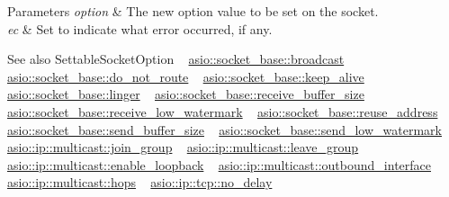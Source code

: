\begin{DoxyParams}{Parameters}
{\em option} & The new option value to be set on the socket.\\
\hline
{\em ec} & Set to indicate what error occurred, if any.\\
\hline
\end{DoxyParams}
\begin{DoxySeeAlso}{See also}
Settable\+Socket\+Option ~\newline
\hyperlink{classasio_1_1socket__base_adb7828bb32a8912680906a66a6551ec3}{asio\+::socket\+\_\+base\+::broadcast} ~\newline
\hyperlink{classasio_1_1socket__base_ab7b1853c3ab069c31202a5ea11deb882}{asio\+::socket\+\_\+base\+::do\+\_\+not\+\_\+route} ~\newline
\hyperlink{classasio_1_1socket__base_a18672db1f78d0e0e58899e90100bf688}{asio\+::socket\+\_\+base\+::keep\+\_\+alive} ~\newline
\hyperlink{classasio_1_1socket__base_a0c1a9362331c7574dbf3ec48d2491c34}{asio\+::socket\+\_\+base\+::linger} ~\newline
\hyperlink{classasio_1_1socket__base_a7d102a034ff7e2a71dfe6434c6ba0525}{asio\+::socket\+\_\+base\+::receive\+\_\+buffer\+\_\+size} ~\newline
\hyperlink{classasio_1_1socket__base_acc8a5f622e3b8345e5aa2c4c733bd0fa}{asio\+::socket\+\_\+base\+::receive\+\_\+low\+\_\+watermark} ~\newline
\hyperlink{classasio_1_1socket__base_a67c5df52b56da13637929727916e4a0a}{asio\+::socket\+\_\+base\+::reuse\+\_\+address} ~\newline
\hyperlink{classasio_1_1socket__base_a0d4a964ee76ec66ae251e903bff872e5}{asio\+::socket\+\_\+base\+::send\+\_\+buffer\+\_\+size} ~\newline
\hyperlink{classasio_1_1socket__base_ac6dce7c293671df85757eeed300d4209}{asio\+::socket\+\_\+base\+::send\+\_\+low\+\_\+watermark} ~\newline
\hyperlink{namespaceasio_1_1ip_1_1multicast_af1296ad63123b3adc414c0bbeb328db3}{asio\+::ip\+::multicast\+::join\+\_\+group} ~\newline
\hyperlink{namespaceasio_1_1ip_1_1multicast_ae0f41e19e723749f6373383e45020844}{asio\+::ip\+::multicast\+::leave\+\_\+group} ~\newline
\hyperlink{namespaceasio_1_1ip_1_1multicast_a6a21cc875fbfac80d2049c95bc7dfe6b}{asio\+::ip\+::multicast\+::enable\+\_\+loopback} ~\newline
\hyperlink{namespaceasio_1_1ip_1_1multicast_a0c7f18a8d8e3922c06d0d3894754b2f5}{asio\+::ip\+::multicast\+::outbound\+\_\+interface} ~\newline
\hyperlink{namespaceasio_1_1ip_1_1multicast_a9fb457c6f8978841b954fc752c04563f}{asio\+::ip\+::multicast\+::hops} ~\newline
\hyperlink{classasio_1_1ip_1_1tcp_a9a35d1c7bb67c0ec1481336cfa826c2e}{asio\+::ip\+::tcp\+::no\+\_\+delay}
\end{DoxySeeAlso}
